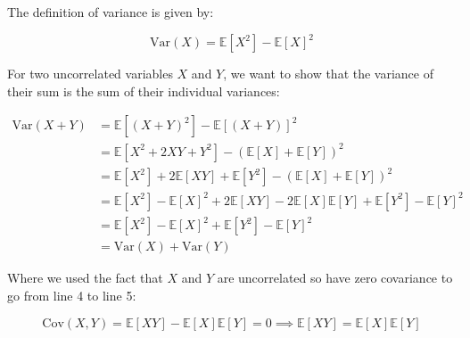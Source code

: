 \documentclass[12pt]{report}
\begin{document}
The definition of variance is given by:

\begin{equation*}
    \text{Var}(X) = \mathbb{E}[X^{2}] - \mathbb{E}[X]^{2}
\end{equation*}

For two uncorrelated variables $X$ and $Y$, we want to show that the variance of their sum is the sum of their individual variances:

\begin{align*}
    \text{Var}(X + Y) & = \mathbb{E}[(X + Y)^{2}] - \mathbb{E}[(X + Y)]^{2}                                                                             \\
                      & = \mathbb{E}[X^{2} + 2XY + Y^{2}] - (\mathbb{E}[X] + \mathbb{E}[Y])^{2}                                                         \\
                      & = \mathbb{E}[X^{2}] + 2\mathbb{E}[XY] + \mathbb{E}[Y^{2}] - (\mathbb{E}[X] + \mathbb{E}[Y])^{2}                                 \\
                      & = \mathbb{E}[X^{2}] - \mathbb{E}[X]^{2} + 2\mathbb{E}[XY] - 2\mathbb{E}[X]\mathbb{E}[Y] + \mathbb{E}[Y^{2}] - \mathbb{E}[Y]^{2} \\
                      & = \mathbb{E}[X^{2}] - \mathbb{E}[X]^{2} + \mathbb{E}[Y^{2}] - \mathbb{E}[Y]^{2}                                                 \\
                      & = \text{Var}(X) + \text{Var}(Y)
\end{align*}

Where we used the fact that $X$ and $Y$ are uncorrelated so have zero covariance to go from line 4 to line 5:

\begin{equation*}
    \text{Cov}(X, Y) = \mathbb{E}[XY] - \mathbb{E}[X]\mathbb{E}[Y] = 0 \implies \mathbb{E}[XY] = \mathbb{E}[X]\mathbb{E}[Y]
\end{equation*}
\end{document}
